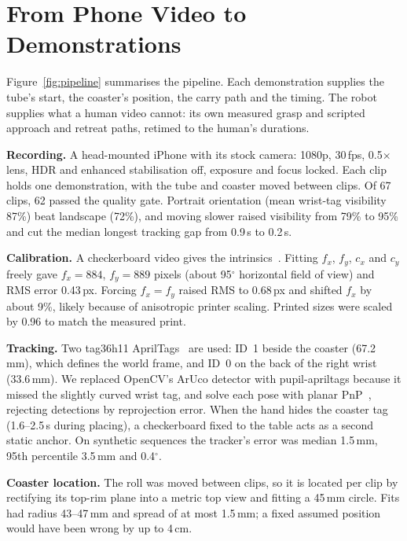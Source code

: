 \documentclass[10pt,twocolumn]{article}
\begin{document}
\section{From Phone Video to Demonstrations}
Figure~\ref{fig:pipeline} summarises the pipeline. Each demonstration supplies the tube's start, the coaster's
position, the carry path and the timing. The robot supplies what a human video cannot: its own measured grasp and
scripted approach and retreat paths, retimed to the human's durations.

\textbf{Recording.} A head-mounted iPhone with its stock camera: 1080p, 30\,fps, 0.5$\times$ lens, HDR and enhanced
stabilisation off, exposure and focus locked. Each clip holds one demonstration, with the tube and coaster moved
between clips. Of 67 clips, 62 passed the quality gate. Portrait orientation (mean wrist-tag visibility 87\%) beat
landscape (72\%), and moving slower raised visibility from 79\% to 95\% and cut the median longest tracking gap from
0.9\,s to 0.2\,s.

\textbf{Calibration.} A checkerboard video gives the intrinsics~\cite{zhang}. Fitting $f_x$, $f_y$, $c_x$ and $c_y$
freely gave $f_x{=}884$, $f_y{=}889$ pixels (about 95$^\circ$ horizontal field of view) and RMS error 0.43\,px.
Forcing $f_x{=}f_y$ raised RMS to 0.68\,px and shifted $f_x$ by about 9\%, likely because of anisotropic printer
scaling. Printed sizes were scaled by 0.96 to match the measured print.

\textbf{Tracking.} Two tag36h11 AprilTags~\cite{apriltag,apriltag2} are used: ID~1 beside the coaster (67.2\,mm), which
defines the world frame, and ID~0 on the back of the right wrist (33.6\,mm). We replaced OpenCV's ArUco detector with
pupil-apriltags because it missed the slightly curved wrist tag, and solve each pose with planar PnP~\cite{ippe},
rejecting detections by reprojection error. When the hand hides the coaster tag (1.6--2.5\,s during placing), a
checkerboard fixed to the table acts as a second static anchor. On synthetic sequences the tracker's error was median
1.5\,mm, 95th percentile 3.5\,mm and 0.4$^\circ$.

\textbf{Coaster location.} The roll was moved between clips, so it is located per clip by rectifying its top-rim plane
into a metric top view and fitting a 45\,mm circle. Fits had radius 43--47\,mm and spread of at most 1.5\,mm; a fixed
assumed position would have been wrong by up to 4\,cm.
\end{document}
